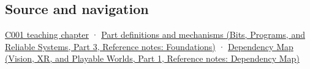 \subsection{Source and navigation}\label{appendix-5bee2df85484-source-and-navigation}

\hypertarget{appendix-5bee2df85484-source-and-navigation}{}

\hyperref[01-foundations-i-ch001-from-a-signal-to-an-interpretation]{C001 teaching chapter} · \href{../01-Bits-Programs-and-Reliable-Systems-P03/main.pdf\#nameddest=appendix-fd090d982a15}{Part definitions and mechanisms (Bits, Programs, and Reliable Systems, Part 3, Reference notes: Foundations)} · \href{../07-Vision-XR-and-Playable-Worlds-P01/main.pdf\#nameddest=appendix-4ad47bdd269a}{Dependency Map (Vision, XR, and Playable Worlds, Part 1, Reference notes: Dependency Map)}

